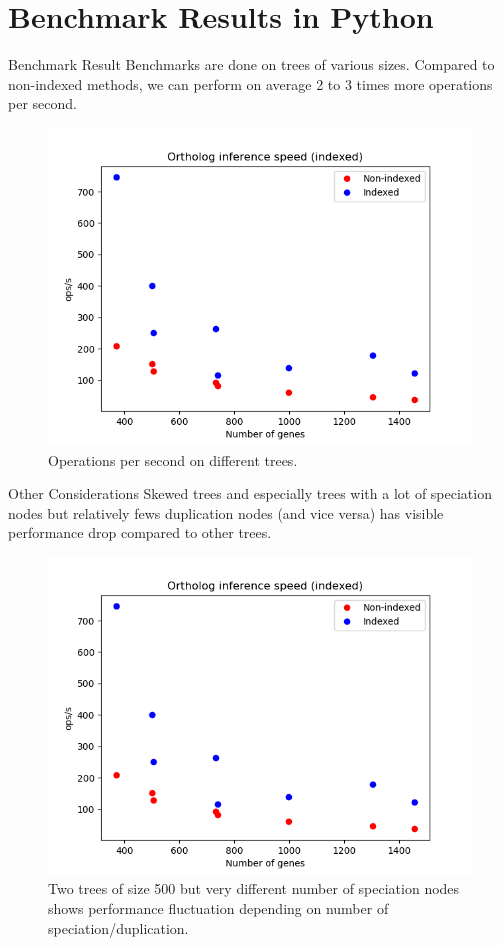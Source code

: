 \documentclass{beamer}
\begin{document}
\section{Benchmark Results in Python}

\begin{frame}{Benchmark Result}
    Benchmarks are done on trees of various sizes. Compared to non-indexed methods, we can perform on average 2 to 3 times more operations per second.

    \begin{figure}[htbp]
        \centering
        \includegraphics[width=0.5\linewidth]{res/ortholog_inference_performance_number_indexed.png}
        \caption{Operations per second on different trees.}
        \label{fig:ops-per-sec-plot}
    \end{figure}
\end{frame}

\begin{frame}{Other Considerations}
    Skewed trees and especially trees with a lot of speciation nodes but relatively fews duplication nodes (and vice versa) has visible performance drop compared to other trees.
    \begin{figure}[htbp]
        \centering
        \includegraphics[width=0.5\linewidth]{res/ortholog_inference_performance_number_indexed.png}
        \caption{Two trees of size 500 but very different number of speciation nodes shows performance fluctuation depending on number of speciation/duplication.}
        \label{fig:ops-per-sec-plot-skew}
    \end{figure}
\end{frame}
\end{document}
